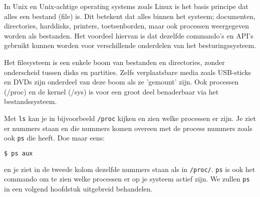 In Unix en Unix-achtige operating systems zoals Linux is het basis principe dat alles een bestand (file) is. Dit betekent dat alles binnen het systeem; documenten, directories, harddisks, printers, toetsenborden, maar ook processen weergegeven worden als bestanden. Het voordeel hiervan is dat dezelfde commando's en API's gebruikt kunnen worden voor verschillende onderdelen van het besturingssysteem.

Het filesysteem is een enkele boom van bestanden en directories, zonder onderscheid tussen disks en partities. Zelfs verplaatsbare media zoals USB-sticks en DVDs zijn onderdeel van deze boom als ze 'gemount' zijn. Ook processen (/proc) en de kernel (/sys) is voor een groot deel benaderbaar via het bestandssysteem.

Met \texttt{ls} kan je in bijvoorbeeld \texttt{/proc} kijken en zien welke processen er zijn. Je ziet er nummers staan en die nummers komen overeen met de process nummers zoals ook \texttt{ps} die heeft. Doe maar eens:
\begin{lstlisting}[language=bash]
$ ps aux
\end{lstlisting}
en je ziet in de tweede kolom dezelfde nummers staan als in \texttt{/proc/}. \texttt{ps} is ook het commando om te zien welke processen er op je systeem actief zijn. We zullen \texttt{ps} in een volgend hoofdstuk uitgebreid behandelen.

